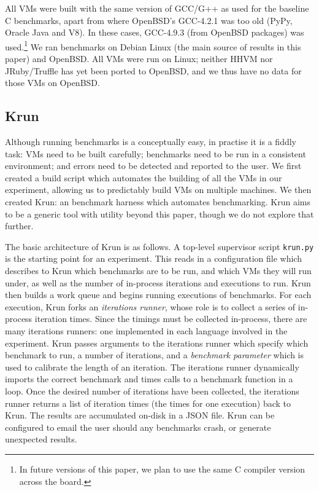 \documentclass[10pt,preprint]{sigplanconf}
\newcommand{\krun}{Krun\xspace}
\begin{document}
All VMs were built with the same version of GCC/G++ as used for the baseline C
benchmarks, apart from where OpenBSD's GCC-4.2.1 was too old (PyPy, Oracle Java
and V8). In these cases, GCC-4.9.3 (from OpenBSD packages) was used.\footnote{In
future versions of this paper, we plan to use the same C compiler version
across the board.} We ran benchmarks on Debian Linux (the main source of
results in this paper) and
OpenBSD. All VMs were run on Linux; neither HHVM nor JRuby/Truffle has yet been
ported to OpenBSD, and we thus have no data for those VMs on OpenBSD.


\subsection{\krun}

Although running benchmarks is a conceptually easy, in practise it is a fiddly task:
VMs need to be built carefully; benchmarks need to be run in a consistent
environment; and errors need to be detected and reported to the user. We first created
a build script which automates the building of all the VMs in our experiment, allowing
us to predictably build VMs on multiple machines. We then created \krun: an
benchmark harness which automates benchmarking. \krun aims to be a generic tool
with utility beyond this paper, though we do not explore that further.

The basic architecture of \krun is as follows. A top-level supervisor script
\texttt{krun.py} is the starting point for an experiment. This reads in a
configuration file which describes to \krun which benchmarks are to be run, and
which VMs they will run under, as well as the number of in-process iterations
and executions to run. \krun then builds a work queue and begins running
executions of benchmarks. For each execution, \krun forks an \emph{iterations
runner}, whose role is to collect a series of in-process iteration times. Since
the timings must be collected in-process, there are many iterations runners:
one implemented in each language involved in the experiment. \krun passes
arguments to the iterations runner which specify which benchmark to run, a
number of iterations, and a \emph{benchmark parameter} which is used to
calibrate the length of an iteration. The iterations runner dynamically imports
the correct benchmark and times calls to a benchmark function in a loop. Once
the desired number of iterations have been collected, the iterations runner
returns a list of iteration times (the times for one execution) back to \krun.
The results are accumulated on-disk in a JSON file. \krun can be configured to
email the user should any benchmarks crash, or generate unexpected results.
\end{document}
